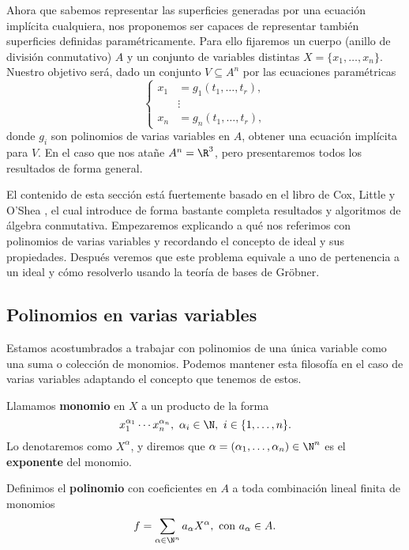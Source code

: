 Ahora que sabemos representar las superficies generadas por una ecuación implícita cualquiera, nos proponemos ser capaces de representar también superficies definidas paramétricamente. Para ello fijaremos un cuerpo (anillo de división conmutativo) $A$ y un conjunto de variables distintas $X=\{x_1,\dots, x_n\}$. Nuestro objetivo será, dado un conjunto $V\subseteq A^n$ por las ecuaciones paramétricas
\begin{equation}\label{eq:param}
    \begin{cases*}
    x_1 &= g_1(t_1,\dots, t_r),\\
    &\vdots \\
    x_n &= g_n(t_1,\dots, t_r),
\end{cases*}
\end{equation}
donde $g_i$ son polinomios de varias variables en $A$, obtener una ecuación implícita para $V$. En el caso que nos atañe $A^n=\R^3$, pero presentaremos todos los resultados de forma general.\newline

El contenido de esta sección está fuertemente basado en el libro  de Cox, Little y O'Shea \cite{ideals_varieties}, el cual introduce de forma bastante completa resultados y algoritmos de álgebra conmutativa. Empezaremos explicando a qué nos referimos con polinomios de varias variables y recordando el concepto de ideal y sus propiedades. Después veremos que este problema equivale a uno de pertenencia a un ideal y cómo resolverlo usando la teoría de bases de Gröbner.

\subsection{Polinomios en varias variables}
Estamos acostumbrados a trabajar con polinomios de una única variable como una suma o colección de monomios. Podemos mantener esta filosofía en el caso de varias variables adaptando el concepto que tenemos de estos.

\begin{definicion}
    Llamamos \textbf{monomio} en $X$ a un producto de la forma
    $$x_1^{\alpha_1} \cdots x_n^{\alpha_n},\ \alpha_i \in \N,\ i\in\{1,\dots, n\}.$$
    Lo denotaremos como $X^{\alpha}$, y diremos que $\alpha = (\alpha_1,\dots, \alpha_n)\in \N^n$ es el \textbf{exponente} del monomio.
\end{definicion}

\begin{definicion}\label{def:polMultVar}
    Definimos el \textbf{polinomio} con coeficientes en $A$ a toda combinación lineal finita de monomios
    \begin{align*}
        f = \sum_{\alpha\in \N^n} a_{\alpha} X^{\alpha}, \text{ con } a_{\alpha} \in A.
    \end{align*}

\end{definicion}


